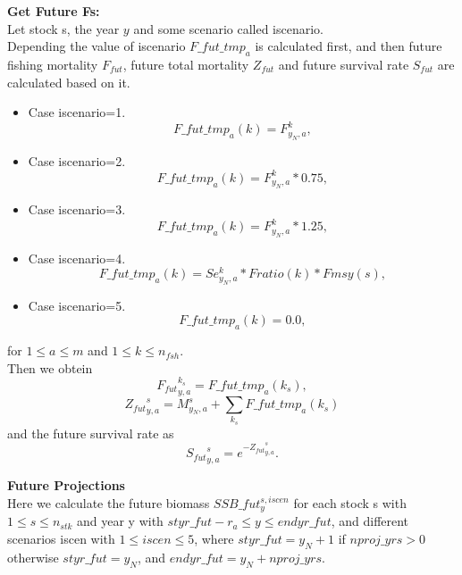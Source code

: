 \documentclass{article}
\begin{document}
\textbf{Get Future Fs:}\\
Let stock s, the year $y$ and some scenario called iscenario.\\
Depending the value of iscenario $F\_fut\_tmp_a$ is calculated first, and then future fishing mortality $F_{fut}$, future total mortality $Z_{fut}$ and future survival rate $S_{fut}$ are calculated based on it.
\begin{itemize}
    \item Case iscenario=1. \begin{equation}
        F\_fut\_tmp_a(k)=F^k_{y_N,a}, 
        \end{equation}
    \item Case iscenario=2.  \begin{equation}
        F\_fut\_tmp_a(k) = F^k_{y_N,a}*0.75,  
    \end{equation}
    \item Case iscenario=3.  \begin{equation}
        F\_fut\_tmp_a(k) = F^{k}_{y_N,a}*1.25, 
    \end{equation}
    \item Case iscenario=4.
    \begin{equation}
        F\_fut\_tmp_a(k)=Se^k_{y_N,a}*Fratio(k)*Fmsy(s),
    \end{equation}
    
    \item Case iscenario=5.
    \begin{equation}
        F\_fut\_tmp_a(k) = 0.0,
    \end{equation}
\end{itemize}
for $1\leq a \leq m$ and  $1\leq k \leq n_{fsh}$.\\

Then we obtein
\begin{equation}
    {F_{fut}}^{k_s}_{y,a}   = F\_fut\_tmp_a({k_s}),
\end{equation}
\begin{equation}
    {Z_{fut}}^s_{y,a}=M^s_{y_N,a}+\sum_{k_s}F\_fut\_tmp_a(k_s)
\end{equation}
and the future survival rate as
\begin{equation}
    {S_{fut}}^s_{y,a}=e^{-{Z_{fut}}^s_{y,a}}.
\end{equation}


\textbf{Future Projections}\\

Here we calculate the future biomass $SSB\_fut^{s,iscen}_{y}$ for each stock s with $1 \leq s \leq n_{stk}$ and year y with $styr\_fut-r_a\leq y \leq endyr\_fut$, and different scenarios iscen with $1\leq iscen \leq 5$, where $styr\_fut=y_N+1$ if $nproj\_yrs>0$ otherwise $styr\_fut=y_N$, and $endyr\_fut=y_N+nproj\_yrs$.\\
\end{document}

